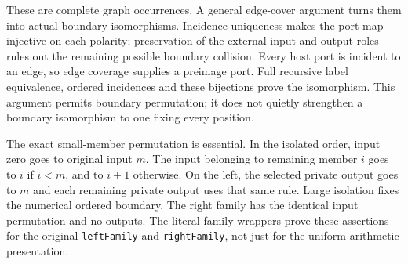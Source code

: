 \par{}
\par{}
\par{}
\par{}
\par{}
%

These are complete graph occurrences. A general edge-cover argument turns
them into actual boundary isomorphisms. Incidence uniqueness makes the port
map injective on each polarity; preservation of the external input and
output roles rules out the remaining possible boundary collision. Every
host port is incident to an edge, so edge coverage supplies a preimage port.
Full recursive label equivalence, ordered incidences and these bijections
prove the isomorphism. This argument permits boundary permutation; it does
not quietly strengthen a boundary isomorphism to one fixing every position.

\par{}
\par{}
\par{}
\par{}
%

The exact small-member permutation is essential. In the isolated order,
input zero goes to original input $m$. The input belonging to remaining
member $i$ goes to $i$ if $i<m$, and to $i+1$ otherwise. On the left, the
selected private output goes to $m$ and each remaining private output uses
that same rule. Large isolation fixes the numerical ordered boundary.
The right family has the identical input permutation and no outputs.
The literal-family wrappers prove these assertions for the original
\texttt{leftFamily} and \texttt{rightFamily}, not just for the uniform
arithmetic presentation.

